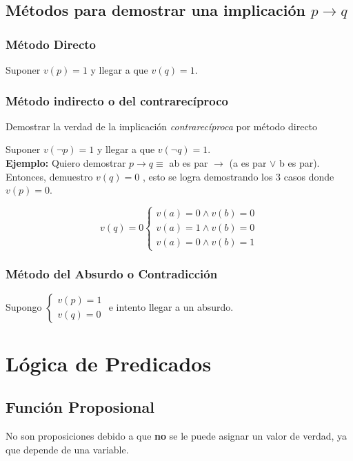 \subsection{Métodos para demostrar una implicación $p \to q$}
\subsubsection{Método Directo}
Suponer $v(p) = 1$ y llegar a que $v(q) = 1$.

\subsubsection{Método indirecto o del contrarecíproco}
Demostrar la verdad de la implicación \emph{contrarecíproca} por método directo

Suponer $v(\lnot p) = 1$ y llegar a que $v(\lnot q) = 1$.\\

\textbf{Ejemplo:} Quiero demostrar $p \to q \equiv$ ab es par $\to$ (a es par $\lor$ b es par).
Entonces, demuestro $v(q) = 0$ , esto se logra demostrando los 3 casos donde $v(p) = 0$.

\begin{equation*}
	v(q)=0\left\{ 	\begin{array}{c}
		v(a)=0\wedge v(b)=0\\
		v(a)=1\wedge v(b)=0\\
		v(a)=0\wedge v(b)=1
	\end{array}\right.
\end{equation*}

\subsubsection{Método del Absurdo o Contradicción}
Supongo $\left\{ \begin{array}{c} v(p)=1\\ v(q)=0\end{array}\right.$ e intento llegar a un absurdo.

\newpage
\section{Lógica de Predicados}
\subsection{Función Proposional}
No son proposiciones debido a que \textbf{no} se le puede asignar un valor de verdad, ya que depende de una variable.\\

